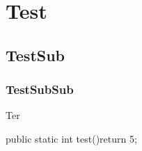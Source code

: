 \documentclass{heiaarticle}
\begin{document}
\buildtitle
\section{Test}
\subsection{TestSub}
\subsubsection{TestSubSub}
\begin{console}
Ter
\end{console}

\begin{Karnaugh4x4}
\end{Karnaugh4x4}

\begin{listing}
public static int test(){return 5;}
\end{listing}
\end{document}
